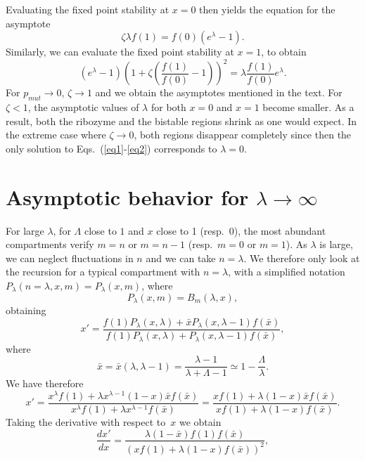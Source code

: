 \documentclass[twocolumn,showpacs,floatfix]{revtex4-1}
\newcommand{\xb}{{\bar x}}
\newcommand{\be}{\begin{equation}}
\newcommand{\ee}{\end{equation}}
\begin{document}
\begin{thebibliography}{99}
\begin{widetext}
Evaluating the fixed point stability at $x=0$ then yields the equation for the asymptote
\be
\zeta \lambda  f(1) = f(0) (e^{\lambda}- 1).
\label{eq1}
\ee
Similarly, we can evaluate the fixed point stability at $x=1$, to obtain
\be
(e^{\lambda}-1) \left( 1+ \zeta \left( \frac{f(1)}{f(0)}  -1 \right) \right)^{2} = \lambda \frac{f(1)}{f(0)} e^{\lambda}.
\label{eq2}
\ee
For $p_{mut}\rightarrow 0$, $\zeta \rightarrow 1$ and we obtain the asymptotes mentioned in the text. 
For $\zeta<1$, the asymptotic values of $\lambda$ for both $x=0$ and $x=1$ become smaller.
As a result, both the ribozyme and the bistable regions shrink as one would expect. In the extreme case where $\zeta \to 0$,
both regions disappear completely since then the only solution to Eqs.~(\ref{eq1}-\ref{eq2}) corresponds to $\lambda=0$.

\section{Asymptotic behavior for $\lambda \rightarrow \infty$}
For large $\lambda$, for $\Lambda$ close to $1$ and $x$ close to 1 (resp.\ 0), the most abundant 
compartments verify $m=n$ or $m=n-1$ (resp.\ $m=0$ or $m=1$). 
As $\lambda$ is large, we can neglect fluctuations in $n$ and we can take $n=\lambda$. 
We therefore only look at the recursion for a typical compartment with $n=\lambda$, with 
a simplified notation $P_\lambda(n=\lambda,x,m)=P_\lambda(x,m)$, where 
\begin{equation}
P_{\lambda}(x,m) = B_m (\lambda,x),
\end{equation}
obtaining
\begin{equation}
x'=\frac{ f(1) P_{\lambda}(x,\lambda) + \bar{x} P_{\lambda}(x,\lambda-1) f(\bar{x}) }{ f(1) P_{\lambda}(x,\lambda) + 
P_{\lambda}(x,\lambda-1) f(\bar{x}) },
\end{equation}
where
\begin{equation}
\xb=\xb(\lambda,\lambda-1)=\frac{\lambda-1}{\lambda+\Lambda-1}\simeq 1-\frac{\Lambda}{\lambda}.
\end{equation}
We have therefore
\begin{equation}
x'=\frac{x^{\lambda}f(1)+\lambda x^{\lambda-1}(1-x)\xb f(\xb)}{x^{\lambda}f(1)+\lambda x^{\lambda-1}f(\xb)}=\frac{x f(1)+\lambda (1-x)\xb f(\xb)}{x f(1)+\lambda(1-x)f(\xb)}.
\end{equation}
Taking the derivative with respect to~$x$ we obtain
\begin{equation}
\frac{d x'}{d x}=\frac{\lambda (1-\xb)f(1)f(\xb)}{(x f(1)+\lambda(1-x)f(\xb))^{2}},

\end{equation}
\end{widetext}
\end{thebibliography}
\end{document}
